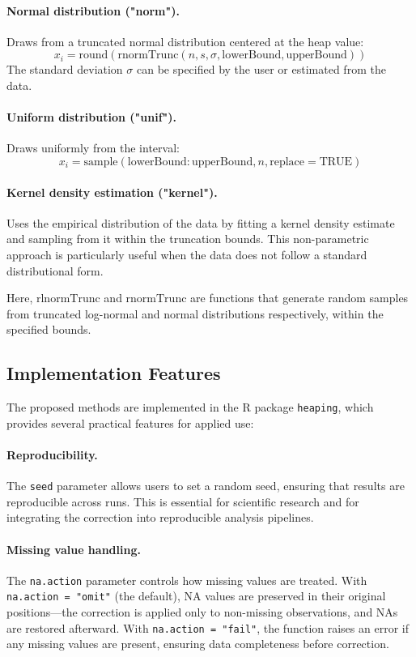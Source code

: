 \documentclass[pdflatex,sn-mathphys-num]{sn-jnl}%
\theoremstyle{thmstyleone}%
\theoremstyle{thmstyletwo}%
\theoremstyle{thmstylethree}%
\begin{document}
\paragraph{Normal distribution ("norm").} Draws from a truncated normal distribution centered at the heap value:
  \[
  x_i = \text{round}(\text{rnormTrunc}(n, s, \sigma, \text{lowerBound}, \text{upperBound}))
  \]
The standard deviation $\sigma$ can be specified by the user or estimated from the data.

\paragraph{Uniform distribution ("unif").} Draws uniformly from the interval:
  \[
  x_i = \text{sample}(\text{lowerBound}:\text{upperBound}, n, \text{replace} = \text{TRUE})
  \]

\paragraph{Kernel density estimation ("kernel").} Uses the empirical distribution of the data by fitting a kernel density estimate and sampling from it within the truncation bounds. This non-parametric approach is particularly useful when the data does not follow a standard distributional form.

Here, \(\text{rlnormTrunc}\) and \(\text{rnormTrunc}\) are functions that generate random samples from truncated log-normal and normal distributions respectively, within the specified bounds.

\subsection{Implementation Features}

The proposed methods are implemented in the R package \texttt{heaping}, which provides several practical features for applied use:

\paragraph{Reproducibility.} The \texttt{seed} parameter allows users to set a random seed, ensuring that results are reproducible across runs. This is essential for scientific research and for integrating the correction into reproducible analysis pipelines.

\paragraph{Missing value handling.} The \texttt{na.action} parameter controls how missing values are treated. With \texttt{na.action = "omit"} (the default), NA values are preserved in their original positions---the correction is applied only to non-missing observations, and NAs are restored afterward. With \texttt{na.action = "fail"}, the function raises an error if any missing values are present, ensuring data completeness before correction.
\end{document}
